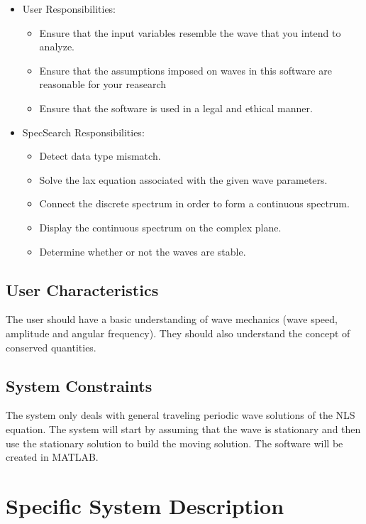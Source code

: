 \documentclass[12pt]{article}
\begin{document}
\begin{itemize}
\item User Responsibilities:
\begin{itemize}
\item Ensure that the input variables resemble the wave that you intend 
to analyze.
\item Ensure that the assumptions imposed on waves in this software are 
reasonable 
for your reasearch
\item Ensure that the software is used in a legal and ethical manner.

\end{itemize}
\item SpecSearch Responsibilities:

\begin{itemize}
\item Detect data type mismatch. 
\item Solve the lax equation associated with the given wave parameters. 
\item Connect the discrete spectrum in order to form a continuous spectrum. 
\item Display the continuous spectrum on the complex plane.
\item Determine whether or not the waves are stable. 
\end{itemize}
\end{itemize}

\subsection{User Characteristics} \label{SecUserCharacteristics}

The user should have a basic understanding of wave mechanics (wave 
speed, 
amplitude and angular frequency). They should also understand the concept of 
conserved quantities. \\ 

\subsection{System Constraints}

The system only deals with general traveling periodic wave solutions of the 
NLS equation. The system will start by assuming that the wave is stationary and 
then use 
the stationary solution to build the moving solution. The software will be 
created in MATLAB.\\


\section{Specific System Description}
\end{document}
